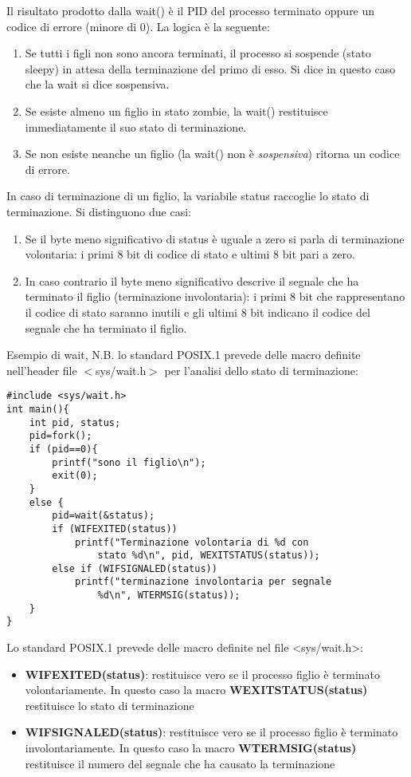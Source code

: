 \documentclass{article}
\begin{document}
\noindent Il risultato prodotto dalla wait() è il PID del processo terminato oppure 
un codice di errore (minore di 0).
La logica è la seguente:
\begin{enumerate}
    \item Se tutti i figli non sono ancora terminati,
    il processo si sospende (stato sleepy) in attesa della terminazione 
    del primo di esso. Si dice in questo caso che la wait si dice sospensiva.
    \item Se esiste almeno un figlio in stato zombie, la wait() restituisce 
    immediatamente il suo stato di terminazione.
    \item Se non esiste neanche un figlio (la wait() non è \textit{sospensiva})
    ritorna un codice di errore.
\end{enumerate}

\noindent In caso di terminazione di un figlio, la variabile status raccoglie lo 
stato di terminazione. Si distinguono due casi:
\begin{enumerate}
    \item Se il byte meno significativo di status è uguale a zero si parla di terminazione volontaria:
    i primi 8 bit di codice di stato e ultimi 8 bit pari a zero. 
    \item In caso contrario il byte meno significativo descrive il segnale
    che ha terminato il figlio (terminazione involontaria): 
    i primi 8 bit che rappresentano il codice di stato saranno inutili e gli ultimi 8 bit 
    indicano il codice del segnale che ha terminato il figlio.
\end{enumerate}

\noindent Esempio di wait, N.B. lo standard POSIX.1 prevede delle macro definite
nell'header file $<$sys/wait.h$>$ per l'analisi dello stato di terminazione:

\begin{lstlisting}[style=CStyle]
#include <sys/wait.h>
int main(){
    int pid, status;
    pid=fork();
    if (pid==0){
        printf("sono il figlio\n");
        exit(0);
    }
    else { 
        pid=wait(&status);
        if (WIFEXITED(status))
            printf("Terminazione volontaria di %d con
                stato %d\n", pid, WEXITSTATUS(status));
        else if (WIFSIGNALED(status))
            printf("terminazione involontaria per segnale
                %d\n", WTERMSIG(status)); 
    }
}
\end{lstlisting}

\noindent Lo standard POSIX.1 prevede delle macro definite nel 
file <sys/wait.h>: \begin{itemize}
    \item \textbf{WIFEXITED(status)}: restituisce vero se il 
     processo figlio è terminato volontariamente. In questo
     caso la macro \textbf{WEXITSTATUS(status)} restituisce 
     lo stato di terminazione
    \item \textbf{WIFSIGNALED(status)}: restituisce vero se il processo
    figlio è terminato involontariamente. In questo caso la
    macro \textbf{WTERMSIG(status)} restituisce il numero del
    segnale che ha causato la terminazione
    \end{itemize}
\end{document}
